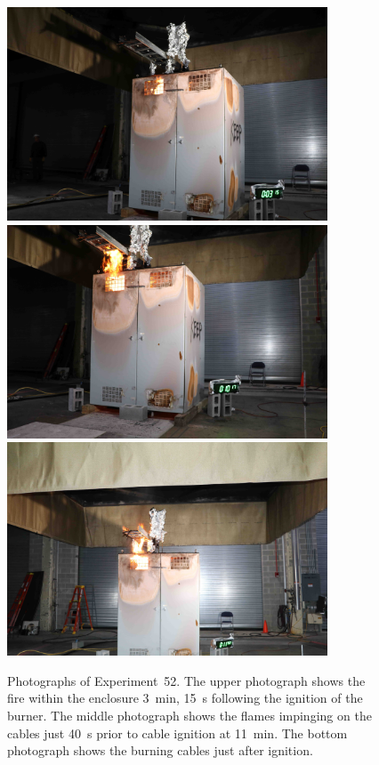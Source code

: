 \begin{figure}[p]
\centering
\includegraphics[height=2.50in]{../FIGURES/Test_52_3_min_15_s} \\
\includegraphics[height=2.50in]{../FIGURES/Test_52_10_min_17_s} \\
\includegraphics[height=2.50in]{../FIGURES/Test_52_11_min_50_s}
\caption[Photographs of Experiment~52]{Photographs of Experiment~52. The upper photograph shows the fire within the enclosure 3~min, 15~s following the ignition of the burner. The middle photograph shows the flames impinging on the cables just 40~s prior to cable ignition at 11~min. The bottom photograph shows the burning cables just after ignition.}
\label{fig:Test_52_photos}
\end{figure}


